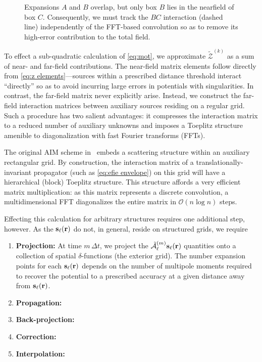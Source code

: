 \begin{figure}
  \centering
  \caption{\label{fig:nearfield correction}Expansions $A$ and $B$ overlap, but only box $B$ lies in the nearfield of box $C$.
    Consequently, we must track the $BC$ interaction (dashed line) independently of the FFT-based convolution so as to remove its high-error contribution to the total field.
  }
\end{figure}

To effect a sub-quadratic calculation of \cref{eq:mot}, we approximate $\tilde{\mathcal{Z}}^{(k)}$ as a sum of near- and far-field contributions.
The near-field matrix elements follow directly from \cref{eq:z elements}---sources within a prescribed distance threshold interact ``directly'' so as to avoid incurring large errors in potentials with singularities.
In contrast, the far-field matrix never explicitly arise.
Instead, we construct the far-field interaction matrices between auxiliary sources residing on a regular grid.
Such a procedure has two salient advantages: it compresses the interaction matrix to a reduced number of auxiliary unknowns and imposes a Toeplitz structure amenible to diagonalization with fast Fourier transforms (FFTs).

The original AIM scheme in~\cite{Bleszynski1996} embeds a scattering structure within an auxiliary rectangular grid.
By construction, the interaction matrix of a translationally-invariant propagator (such as \cref{eq:efie envelope}) on this grid will have a hierarchical (block) Toeplitz structure.
This structure affords a very efficient matrix multiplication: as this matrix represents a discrete convolution, a multidimensional FFT diagonalizes the entire matrix in $\mathcal{O}(n \log n)$ steps.

Effecting this calculation for arbitrary structures requires one additional step, however.
As the $\vb{s}_\ell(\vb{r})$ do not, in general, reside on structured grids, we require 

\begin{enumerate}
  \item \textbf{Projection:} At time $m \, \Delta t$, we project the $\tilde{\mathcal{A}}^{(m)}_\ell \vb{s}_\ell(\vb{r})$ quantities onto a collection of spatial $\delta$-functions (the exterior grid).
    The number expansion points for each $\vb{s}_\ell(\vb{r})$ depends on the number of multipole moments required to recover the potential to a prescribed accuracy at a given distance away from $\vb{s}_\ell(\vb{r})$.
  \item \textbf{Propagation:}
  \item \textbf{Back-projection:}
  \item \textbf{Correction:}
  \item \textbf{Interpolation:}
\end{enumerate}

